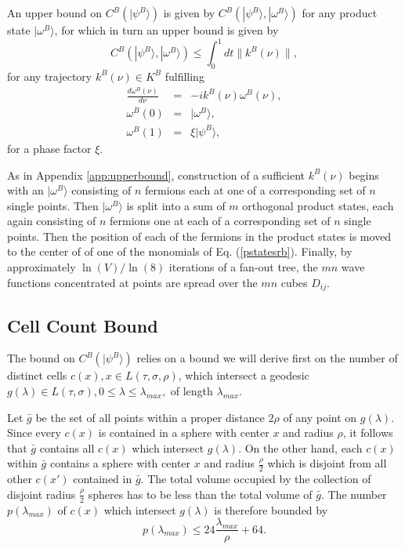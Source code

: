 \documentclass[12pt,amsmath,amssymb,onecolumn]{revtex4-2}
\begin{document}
An upper bound on $C^B( |\psi^B \rangle )$ 
is given by $C^B( |\psi^B \rangle , |\omega^B \rangle )$ for any product state
$|\omega^B \rangle $, for which in turn an upper bound is given by 
\begin{equation}
\label{cpsiomega1}
C^B( |\psi^B \rangle , |\omega^B \rangle ) \le \int_0^1 d t \parallel k^B( \nu) \parallel,
\end{equation} 
for any 
trajectory $k^B(\nu) \in K^B$ fulfilling
\begin{subequations}
\begin{eqnarray}
\label{udot1}
\frac{d\omega^B(\nu)}{d \nu} & = &-i k^B( \nu) \omega^B( \nu), \\
\label{uboundary1}
\omega^B( 0) & = & |\omega^B \rangle , \\
\label{uboundary2}
\omega^B( 1) & = & \xi |\psi^B \rangle ,
\end{eqnarray}
\end{subequations}
for a phase factor $\xi$.

As in Appendix \ref{app:upperbound}, construction of a
sufficient $k^B(\nu)$ 
begins with an $|\omega^B \rangle $
consisting of $n$ fermions each at one of a corresponding set of
$n$ single points.
Then $|\omega^B \rangle $
is split into a sum of $m$ orthogonal product states, each again consisting
of $n$ fermions one at each of a corresponding set of $n$ single points. Then the 
position of each of the fermions in the product states is moved to the center of
of one of the monomials of Eq. (\ref{pstatesrb}). 
Finally, by approximately $\ln( V) / \ln( 8)$ iterations of a
fan-out tree, the $m n$ wave functions concentrated at points are spread over the 
$m n$ cubes $D_{ij}$.

\subsection{\label{app:subsecpath} Cell Count Bound}

The bound on $C^B( |\psi^B \rangle )$ relies on a bound we
will derive first on the number  of
distinct cells $c(x), x \in L( \tau, \sigma, \rho)$,
which intersect a geodesic
 $ g( \lambda) \in L( \tau, \sigma), 0 \le \lambda \le \lambda_{max},$
of length $\lambda_{max}$.

Let $\bar{g}$ be the set of all points
within a proper distance $2 \rho$ of any point on $g(\lambda)$.
Since every $c(x)$ is contained in
a sphere with center $x$ and radius $\rho$, it follows that
$\bar{g}$ contains all $c(x)$ which intersect $g(\lambda)$.
On the other hand, each $c(x)$ within $\bar{g}$ contains a sphere with center $x$
and radius $\frac{\rho}{2}$ which is disjoint from all other $c(x')$ contained
in $\bar{g}$. The total volume occupied by the collection of disjoint
radius $\frac{\rho}{2}$ spheres has to be less than the total volume of $\bar{g}$.
The number $p(\lambda_{max})$ of $c(x)$ which intersect $g(\lambda)$  
is therefore bounded by
\begin{equation}
  \label{nubound}
  p( \lambda_{max}) \le 24 \frac{ \lambda_{max}}{\rho} + 64.
\end{equation}
\end{document}
